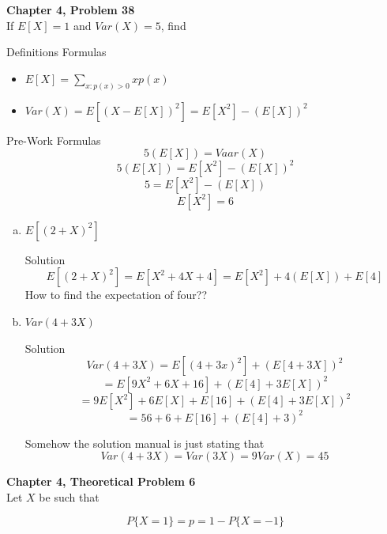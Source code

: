 \documentclass{article}
\begin{document}
\begin{spacing}{1.1}
\newpage
\begin{homeworkProblem}
  {\bf Chapter 4, Problem 38}\\
  If $E[ X] = 1$ and $Var( X) = 5$, find 
  \begin{homeworkSection}{Definitions}
    Formulas
      \begin{itemize}
        \item $E[ X] = \sum\limits_{x:p( x) > 0}{ x p( x)}$
        \item $Var( X) = E[ (X - E[ X])^2] = E[ X^2] - (E[ X])^2$
      \end{itemize}
  \end{homeworkSection}
  \begin{homeworkSection}{Pre-Work}
    Formulas
      \[5 (E[ X]) = Vaar( X)\]
      \[5 (E[ X]) = E[ X^2] - (E[ X])^2\]
      \[5 = E[ X^2] - (E[ X])\]
      \[E[ X^2] = 6\]
  \end{homeworkSection}
  \begin{enumerate}[(a)]
    \item $E[ (2 + X)^2]$
      \begin{homeworkSection}{Solution}
        \[E[ (2 + X)^2] = E[ X^2 + 4X + 4] = E[ X^2] + 4 (E[ X]) + E[ 4] \]
        How to find the expectation of four??
      \end{homeworkSection}
    \item $Var( 4 + 3X)$
      \begin{homeworkSection}{Solution}
        \[Var( 4 + 3X) = E[ (4 + 3x)^2] + (E[ 4 + 3X])^2\]
        \[= E[ 9 X^2 + 6 X + 16] + (E[ 4] + 3 E[ X])^2\]
        \[= 9 E[ X^2] + 6 E[ X] + E[ 16] + (E[ 4] + 3 E[ X])^2\]
        \[= 56 + 6 + E[ 16] + (E[ 4] + 3)^2\]

        Somehow the solution manual is just stating that 
        \[Var( 4 + 3X) = Var( 3X) = 9 Var( X) = 45\]

      \end{homeworkSection}
  \end{enumerate}
\end{homeworkProblem}

\newpage
\begin{homeworkProblem}
  {\bf Chapter 4, Theoretical Problem 6}\\
  Let $X$ be such that

  \[P\{ X = 1\} = p = 1 - P\{ X = -1\}\]


\end{homeworkProblem}
\end{spacing}
\end{document}
